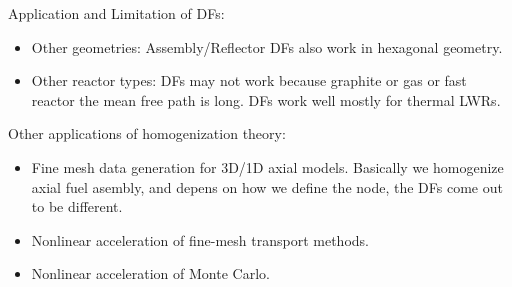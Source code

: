 \documentclass{school-22.211-notes}
\begin{document}
Application and Limitation of DFs:
\begin{itemize}
\item Other geometries: Assembly/Reflector DFs also work in hexagonal geometry. 
\item Other reactor types: DFs may not work because graphite or gas or fast reactor the mean free path is long. DFs work well mostly for thermal LWRs. 
\end{itemize}

Other applications of homogenization theory: 
\begin{itemize}
\item Fine mesh data generation for 3D/1D axial models. Basically we homogenize axial fuel asembly, and depens on how we define the node, the DFs come out to be different. 
\item Nonlinear acceleration of fine-mesh transport methods. 
\item Nonlinear acceleration of Monte Carlo. 
\end{itemize}
\end{document}
